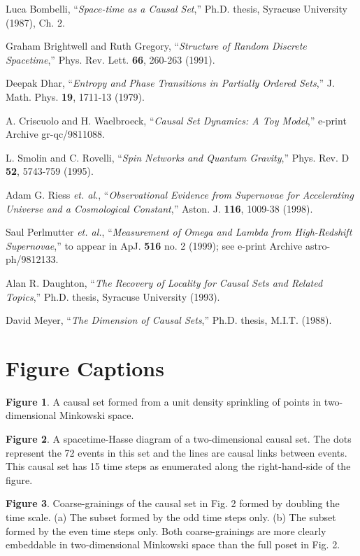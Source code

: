 \begin{references}
  Luca Bombelli, ``{\it Space-time as a Causal Set},'' Ph.D.
thesis, Syracuse University (1987), Ch. 2.

  Graham Brightwell and Ruth Gregory, ``{\it Structure of Random
Discrete Spacetime},'' Phys. Rev. Lett. {\bf 66}, 260-263 (1991).

  Deepak Dhar, ``{\it Entropy and Phase Transitions in Partially
Ordered Sets},'' J. Math. Phys. {\bf 19}, 1711-13 (1979).

  A. Criscuolo and H. Waelbroeck, ``{\it Causal Set Dynamics: A
Toy Model},'' e-print Archive gr-qc/9811088.

  L. Smolin and C. Rovelli, ``{\it Spin Networks and Quantum
Gravity},'' Phys. Rev. D {\bf 52}, 5743-759 (1995).

  Adam G. Riess {\it et. al.}, ``{\it Observational Evidence
from Supernovae for Accelerating Universe and a Cosmological Constant},''
Aston. J. {\bf 116}, 1009-38 (1998).

  Saul Perlmutter {\it et. al.}, ``{\it Measurement of Omega and
Lambda from High-Redshift Supernovae},'' to appear in ApJ. {\bf 516} no. 2
(1999); see e-print Archive astro-ph/9812133.

  Alan R. Daughton, ``{\it The Recovery of Locality for Causal
Sets and Related Topics},'' Ph.D. thesis, Syracuse University (1993).

  David Meyer, ``{\it The Dimension of Causal Sets},'' Ph.D.
thesis, M.I.T. (1988).
\end{references}

\section{Figure Captions}

{\bf Figure 1}. A causal set formed from a unit density sprinkling of points
in two-dimensional Minkowski space.

{\bf Figure 2}. A spacetime-Hasse diagram of a two-dimensional causal set.
The dots represent the 72 events in this set and the lines are causal links
between events. This causal set has 15 time steps as enumerated along the
right-hand-side of the figure.

{\bf Figure 3}. Coarse-grainings of the causal set in Fig. 2 formed by
doubling the time scale. (a) The subset formed by the odd time steps only.
(b) The subset formed by the even time steps only. Both coarse-grainings are
more clearly embeddable in two-dimensional Minkowski space than the full
poset in Fig. 2.


